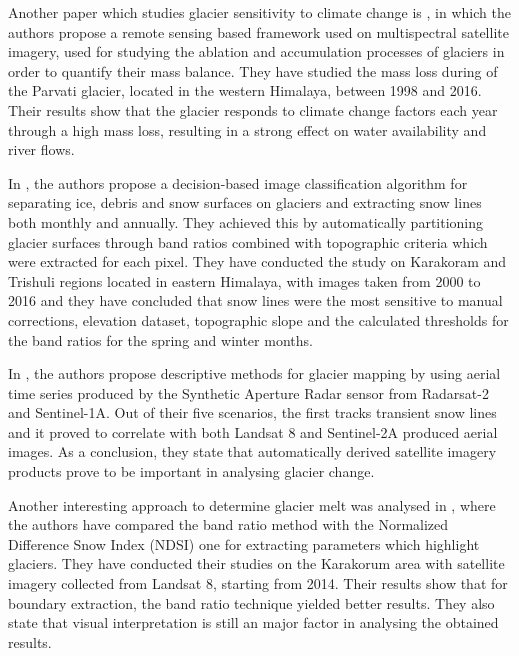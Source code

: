 \documentclass[12pt, a4paper]{report}
\begin{document}
	\par Another paper which studies glacier sensitivity to climate change is \cite{TAK2020}, in which the authors propose a remote sensing based framework used on multispectral satellite imagery, used for studying the ablation and accumulation processes of glaciers in order to quantify their mass balance. They have studied the mass loss during of the Parvati glacier, located in the western Himalaya, between 1998 and 2016. Their results show that the glacier responds to climate change factors each year through a high mass loss, resulting in a strong effect on water availability and river flows.
	
	\par In \cite{RACOVITEANU2019}, the authors propose a decision-based image classification algorithm for separating ice, debris and snow surfaces on glaciers and extracting snow lines both monthly and annually. They achieved this by automatically partitioning glacier surfaces through band ratios combined with topographic criteria which were extracted for each pixel. They have conducted the study on Karakoram and Trishuli regions located in eastern Himalaya, with images taken from 2000 to 2016 and they have concluded that snow lines were the most sensitive to manual corrections, elevation dataset, topographic slope and the calculated thresholds for the band ratios for the spring and winter months.
	
	\par In \cite{WINSVOLD2017}, the authors propose descriptive methods for glacier mapping by using aerial time series produced by the Synthetic Aperture Radar sensor from Radarsat-2 and Sentinel-1A. Out of their five scenarios, the first tracks transient snow lines and it proved to correlate with both Landsat 8 and Sentinel-2A produced aerial images. As a conclusion, they state that automatically derived satellite imagery products prove to be important in analysing glacier change.
	
	\par Another interesting approach to determine glacier melt was analysed in \cite{WANG2017}, where the authors have compared the band ratio method with the Normalized Difference Snow Index (NDSI) one for extracting parameters which highlight glaciers. They have conducted their studies on the Karakorum area with satellite imagery collected from Landsat 8, starting from 2014. Their results show that for boundary extraction, the band ratio technique yielded better results. They also state that visual interpretation is still an major factor in analysing the obtained results.
	
\end{document}
